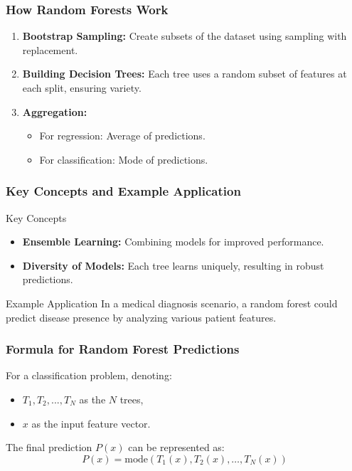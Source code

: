 \documentclass[aspectratio=169]{beamer}
\begin{document}
\begin{frame}[fragile]
    \frametitle{How Random Forests Work}
    \begin{enumerate}
        \item \textbf{Bootstrap Sampling:} Create subsets of the dataset using sampling with replacement.
        \item \textbf{Building Decision Trees:} Each tree uses a random subset of features at each split, ensuring variety.
        \item \textbf{Aggregation:}
            \begin{itemize}
                \item For regression: Average of predictions.
                \item For classification: Mode of predictions.
            \end{itemize}
    \end{enumerate}
\end{frame}

\begin{frame}[fragile]
    \frametitle{Key Concepts and Example Application}
    \begin{block}{Key Concepts}
        \begin{itemize}
            \item \textbf{Ensemble Learning:} Combining models for improved performance.
            \item \textbf{Diversity of Models:} Each tree learns uniquely, resulting in robust predictions.
        \end{itemize}
    \end{block}
    \begin{block}{Example Application}
        In a medical diagnosis scenario, a random forest could predict disease presence by analyzing various patient features.
    \end{block}
\end{frame}

\begin{frame}[fragile]
    \frametitle{Formula for Random Forest Predictions}
    For a classification problem, denoting:
    \begin{itemize}
        \item $T_1, T_2, ..., T_N$ as the $N$ trees,
        \item $x$ as the input feature vector.
    \end{itemize}
    The final prediction $P(x)$ can be represented as:
    \begin{equation}
        P(x) = \text{mode}(T_1(x), T_2(x), \ldots, T_N(x))
    \end{equation}
\end{frame}
\end{document}
